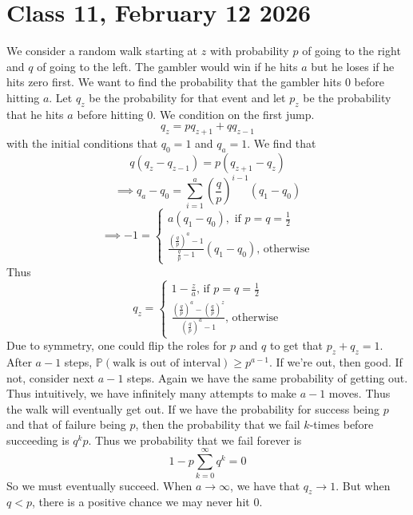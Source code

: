 \documentclass{article}
\begin{document}
\section*{Class 11, February 12 2026}
We consider a random walk starting at $z$ with probability $p$ of going to the right and $q$ of going to the left. The gambler would win if he hits $a$ but he loses if he hits zero first.
We want to find the probability that the gambler hits 0 before hitting $a$. Let $q_z$ be the probability for that event and let $p_z$ be the probability that he hits $a$ before hitting 0.  We condition on the first jump.
$$q_z=pq_{z+1}+qq_{z-1}$$ 
with the initial conditions that $q_0=1$ and $q_a=1$. We find that
$$q(q_z-q_{z-1})=p(q_{z+1}-q_z)$$ 
$$\implies q_a-q_0=\sum_{i=1}^{a}\left(\frac{q}{p}\right)^{i-1}(q_1-q_0)$$
$$\implies -1=\begin{cases}
a(q_1-q_0),\text{ if }p=q=\frac{1}{2}\\
\frac{\left(\frac{q}{p}\right)^a -1}{\frac{q}{p} -1}(q_1-q_0 )\text{, otherwise}
\end{cases}$$
Thus
$$q_z=\begin{cases}
1-\frac{z}{a}\text{, if }p=q=\frac{1}{2}\\
\frac{\left(\frac{q}{p}\right)^a -\left(\frac{q}{p}\right)^{z}}{\left(\frac{q}{p}\right)^a -1}\text{, otherwise}
\end{cases}$$
Due to symmetry, one could flip the roles for $p$ and $q$ to get that $p_z+q_z=1$.
\\After $a-1$ steps, $\mathbb{P}(\text{walk is out of interval})\geq p^{a-1}$. If we're out, then good. If not, consider next $a-1$ steps. Again we have the same probability of getting out. Thus intuitively, we have infinitely many attempts to make $a-1$ moves. Thus the walk will eventually get out.
If we have the probability for success being $p$ and that of failure being $p$, then the probability that we fail $k$-times before succeeding is $q^k p$. Thus we probability that we fail forever is 
$$1-p\sum_{k=0}^{\infty}q^k=0$$
So we must eventually succeed. When $a\to \infty$, we have that $q_z\to 1$.
But when $q<p$, there is a positive chance we may never hit 0.
\end{document}
